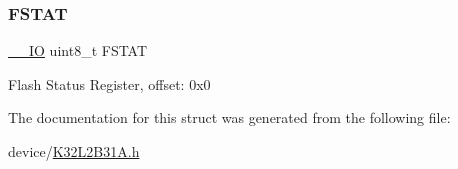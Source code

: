 \subsubsection{\texorpdfstring{FSTAT}{FSTAT}}
{\footnotesize\ttfamily \mbox{\hyperlink{core__cm0plus_8h_aec43007d9998a0a0e01faede4133d6be}{\+\_\+\+\_\+\+IO}} uint8\+\_\+t F\+S\+T\+AT}

Flash Status Register, offset\+: 0x0 

The documentation for this struct was generated from the following file\+:\begin{DoxyCompactItemize}
\item 
device/\mbox{\hyperlink{_k32_l2_b31_a_8h}{K32\+L2\+B31\+A.\+h}}\end{DoxyCompactItemize}
